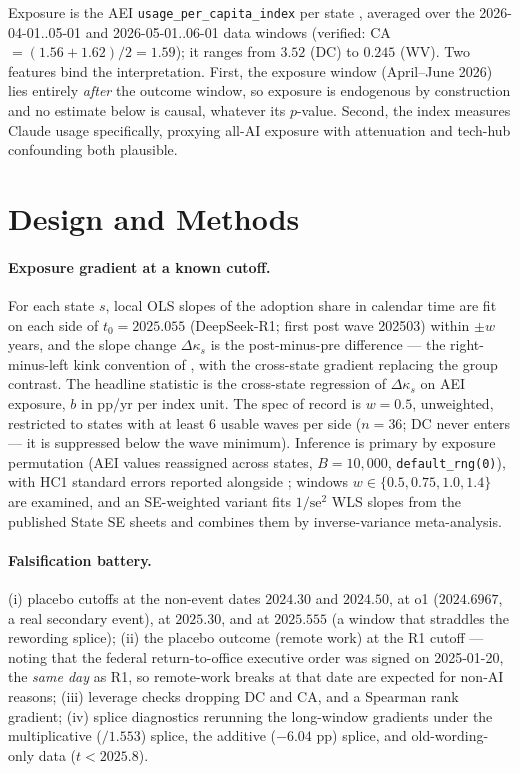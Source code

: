 \documentclass[11pt]{article}
\begin{document}
Exposure is the AEI \texttt{usage\_per\_capita\_index} per state
\cite{appel2025}, averaged over the 2026-04-01..05-01 and 2026-05-01..06-01
data windows (verified: CA $=(1.56+1.62)/2=1.59$); it ranges from $3.52$ (DC)
to $0.245$ (WV). Two features bind the interpretation. First, the exposure
window (April--June 2026) lies entirely \emph{after} the outcome window, so
exposure is endogenous by construction and no estimate below is causal,
whatever its $p$-value. Second, the index measures Claude usage specifically,
proxying all-AI exposure with attenuation and tech-hub confounding both
plausible.

\section{Design and Methods}\label{sec:methods}

\paragraph{Exposure gradient at a known cutoff.} For each state $s$, local
OLS slopes of the adoption share in calendar time are fit on each side of
$t_0=2025.055$ (DeepSeek-R1; first post wave 202503) within $\pm w$ years,
and the slope change $\Delta\kappa_s$ is the post-minus-pre difference ---
the right-minus-left kink convention of \cite{bockerman2025}, with the
cross-state gradient replacing the group contrast. The headline statistic is
the cross-state regression of $\Delta\kappa_s$ on AEI exposure, $b$ in pp/yr
per index unit. The spec of record is $w=0.5$, unweighted, restricted to
states with at least 6 usable waves per side ($n=36$; DC never enters ---
it is suppressed below the wave minimum). Inference is primary by exposure
permutation (AEI values reassigned across states, $B=10{,}000$,
\texttt{default\_rng(0)}), with HC1 standard errors reported alongside
\cite{cameron2015}; windows $w\in\{0.5, 0.75, 1.0, 1.4\}$ are examined, and
an SE-weighted variant fits $1/\mathrm{se}^2$ WLS slopes from the published
State SE sheets and combines them by inverse-variance meta-analysis.

\paragraph{Falsification battery.} (i) placebo cutoffs at the non-event dates
$2024.30$ and $2024.50$, at o1 ($2024.6967$, a real secondary event), at
$2025.30$, and at $2025.555$ (a window that straddles the rewording splice);
(ii) the placebo outcome (remote work) at the R1 cutoff --- noting that the
federal return-to-office executive order was signed on 2025-01-20, the
\emph{same day} as R1, so remote-work breaks at that date are expected for
non-AI reasons; (iii) leverage checks dropping DC and CA, and a Spearman rank
gradient; (iv) splice diagnostics rerunning the long-window gradients under
the multiplicative ($/1.553$) splice, the additive ($-6.04$ pp) splice, and
old-wording-only data ($t<2025.8$).
\end{document}
